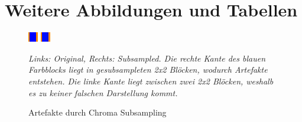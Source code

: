 \appendix
\chapter{Weitere Abbildungen und Tabellen}
\label{appendix:abb_tab}
\begin{figure}[h!]
    \centering
    \includegraphics[scale=10]{images/2-1_chroma_artefacts_original.png}
    \includegraphics[scale=10]{images/2-1_chroma_artefacts_sampled.png}
    \caption{Artefakte durch Chroma Subsampling}
    \textit{Links: Original, Rechts: Subsampled. Die rechte Kante des blauen Farbblocks liegt in gesubsampleten 2x2 Blöcken, wodurch Artefakte entstehen. Die linke Kante liegt zwischen zwei 2x2 Blöcken, weshalb es zu keiner falschen Darstellung kommt.}
    \label{fig:chroma_artefacts}
\end{figure}

